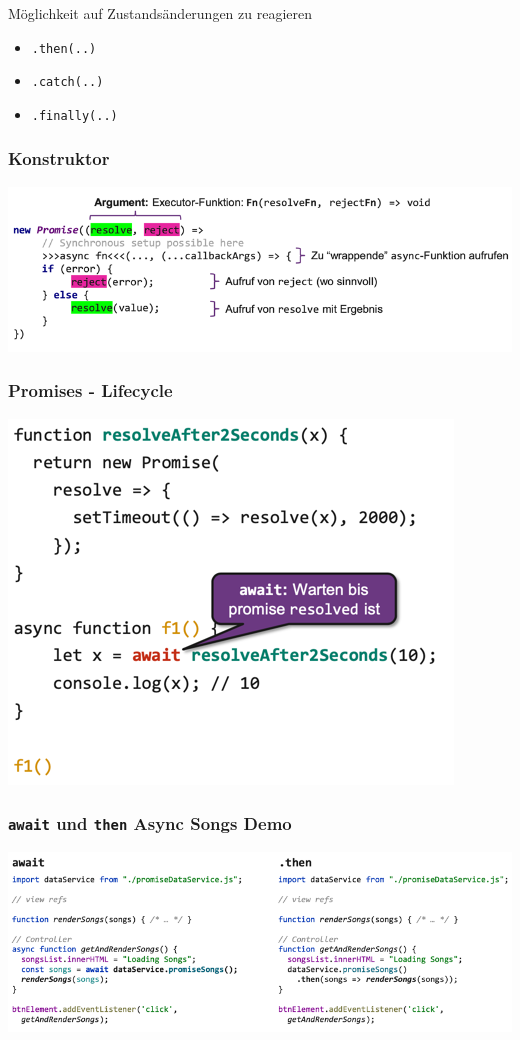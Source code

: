 \documentclass[a4paper, landscape, 8pt]{scrartcl}
\begin{document}
\begin{multicols*}{4}
        Möglichkeit auf Zustandsänderungen zu reagieren
        \begin{itemize}
            \item \texttt{.then(..)}
            \item \texttt{.catch(..)}
            \item \texttt{.finally(..)}
        \end{itemize}

        \subsubsection{Konstruktor}
        \includegraphics[width=\columnwidth]{graphic/21-promise-constructor}

        \subsubsection{Promises - Lifecycle}
        \includegraphics[scale=0.3]{graphic/22-await-promises}

        \subsubsection{\texttt{await} und \texttt{then} {\tiny Async Songs Demo}}
        \includegraphics[width=\columnwidth]{graphic/23-async-songs-demo}


\end{multicols*}
\end{document}
